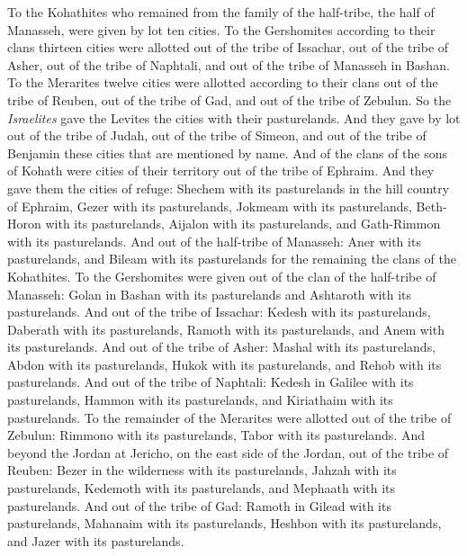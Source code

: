 \begin{biblechapter}
\verse To the Kohathites who remained from the family of the half-tribe, the half of Manasseh, were given by lot ten cities.
\verse To the Gershomites according to their clans thirteen cities were allotted out of the tribe of Issachar, out of the tribe of Asher, out of the tribe of Naphtali, and out of the tribe of Manasseh in Bashan.
\verse To the Merarites twelve cities were allotted according to their clans out of the tribe of Reuben, out of the tribe of Gad, and out of the tribe of Zebulun.
\verse So the \textit{Israelites} gave the Levites the cities with their pasturelands.
\verse And they gave by lot out of the tribe of Judah, out of the tribe of Simeon, and out of the tribe of Benjamin these cities that are mentioned by name.
\verse And of the clans of the sons of Kohath were cities of their territory out of the tribe of Ephraim.
\verse And they gave them the cities of refuge: Shechem with its pasturelands in the hill country of Ephraim, Gezer with its pasturelands,
\verse Jokmeam with its pasturelands, Beth-Horon with its pasturelands,
\verse Aijalon with its pasturelands, and Gath-Rimmon with its pasturelands.
\verse And out of the half-tribe of Manasseh: Aner with its pasturelands, and Bileam with its pasturelands for the remaining the clans of the Kohathites.
\verse To the Gershomites were given out of the clan of the half-tribe of Manasseh: Golan in Bashan with its pasturelands and Ashtaroth with its pasturelands.
\verse And out of the tribe of Issachar: Kedesh with its pasturelands, Daberath with its pasturelands,
\verse Ramoth with its pasturelands, and Anem with its pasturelands.
\verse And out of the tribe of Asher: Mashal with its pasturelands, Abdon with its pasturelands,
\verse Hukok with its pasturelands, and Rehob with its pasturelands.
\verse And out of the tribe of Naphtali: Kedesh in Galilee with its pasturelands, Hammon with its pasturelands, and Kiriathaim with its pasturelands.
\verse To the remainder of the Merarites were allotted out of the tribe of Zebulun: Rimmono with its pasturelands, Tabor with its pasturelands.
\verse And beyond the Jordan at Jericho, on the east side of the Jordan, out of the tribe of Reuben: Bezer in the wilderness with its pasturelands, Jahzah with its pasturelands,
\verse Kedemoth with its pasturelands, and Mephaath with its pasturelands.
\verse And out of the tribe of Gad: Ramoth in Gilead with its pasturelands, Mahanaim with its pasturelands,
\verse Heshbon with its pasturelands, and Jazer with its pasturelands.
\end{biblechapter}

